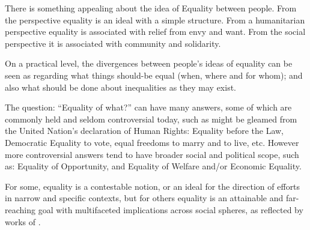 There is something appealing about the idea of Equality between people.
From the \DIFdelbegin {}\DIFdelend \DIFaddbegin {}\DIFaddend perspective equality is an ideal with a simple structure. From a humanitarian perspective equality is associated with relief from envy and want. From the social perspective it is associated with community and solidarity.%


On a practical level, the divergences between people's ideas of equality can be seen as regarding what things should-be equal (when, where and for whom); and also what should be done about inequalities as they may exist.

The question: ``Equality of what?'' can have many answers, some of which are commonly held and seldom controversial today, such as might be gleamed from the United Nation's declaration of Human Rights: Equality before the Law, Democratic Equality to vote, equal freedoms to marry and to live, etc.
However more controversial answers tend to have broader social and political scope, such as: Equality of Opportunity, and Equality of Welfare and/or Economic Equality.%

For some, equality is a contestable notion, or an ideal for the direction of efforts in narrow and specific contexts, but for others equality is an attainable and far-reaching goal with multifaceted implications across social spheres, as reflected by works of \cite{walzer2008spheres,millerandwalzer,baker1992arguing}.

